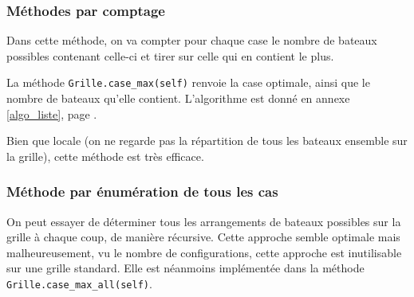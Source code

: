 \subsubsection{Méthodes par comptage}
Dans cette méthode, on va compter pour chaque case le nombre de bateaux possibles contenant celle-ci et tirer sur celle qui en contient le plus.

La méthode \texttt{Grille.case\_max(self)} renvoie la case optimale, ainsi que le nombre de bateaux qu'elle contient. L'algorithme est donné en annexe \ref{algo_liste}, page \pageref{case_max}.



Bien que locale (on ne regarde pas la répartition de tous les bateaux ensemble sur la grille), cette méthode est très efficace.


\subsubsection{Méthode par énumération de tous les cas}

On peut essayer de déterminer tous les arrangements de bateaux possibles sur la grille à chaque coup, de manière récursive. Cette approche semble optimale mais malheureusement, vu le nombre de configurations, cette approche est inutilisable sur une grille standard. Elle est néanmoins implémentée dans la méthode \texttt{Grille.case\_max\_all(self)}.

